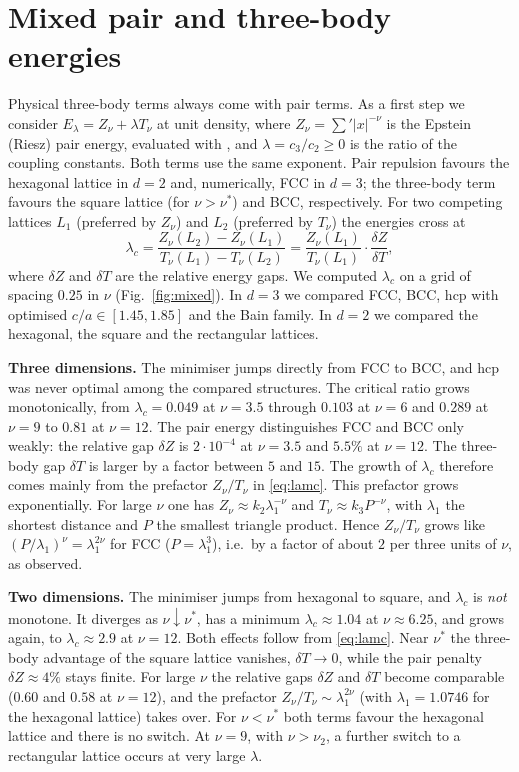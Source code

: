 \documentclass[10pt,twocolumn,a4paper]{article}
\theoremstyle{definition}
\begin{document}
\section{Mixed pair and three-body energies}\label{sec:mixed}
Physical three-body terms always come with pair terms. As a first step we consider
$E_\lambda=Z_\nu+\lambda T_\nu$ at unit density, where $Z_\nu=\sum'|x|^{-\nu}$ is the Epstein (Riesz) pair energy, evaluated with \cite{EpsteinLib}, and $\lambda=c_3/c_2\ge0$ is the ratio of the coupling constants. Both terms use the same exponent. Pair repulsion favours the hexagonal lattice in $d=2$ and, numerically, FCC in $d=3$; the three-body term favours the square lattice (for $\nu>\nu^*$) and BCC, respectively. For two competing lattices $L_1$ (preferred by $Z_\nu$) and $L_2$ (preferred by $T_\nu$) the energies cross at
\begin{equation}\label{eq:lamc}
\lambda_c=\frac{Z_\nu(L_2)-Z_\nu(L_1)}{T_\nu(L_1)-T_\nu(L_2)}=\frac{Z_\nu(L_1)}{T_\nu(L_1)}\cdot\frac{\delta Z}{\delta T},
\end{equation}
where $\delta Z$ and $\delta T$ are the relative energy gaps. We computed $\lambda_c$ on a grid of spacing $0.25$ in $\nu$ (Fig.~\ref{fig:mixed}). In $d=3$ we compared FCC, BCC, hcp with optimised $c/a\in[1.45,1.85]$ and the Bain family. In $d=2$ we compared the hexagonal, the square and the rectangular lattices.

\smallskip\noindent\textbf{Three dimensions.} The minimiser jumps directly from FCC to BCC, and hcp was never optimal among the compared structures. The critical ratio grows monotonically, from $\lambda_c=0.049$ at $\nu=3.5$ through $0.103$ at $\nu=6$ and $0.289$ at $\nu=9$ to $0.81$ at $\nu=12$. The pair energy distinguishes FCC and BCC only weakly: the relative gap $\delta Z$ is $2\cdot10^{-4}$ at $\nu=3.5$ and $5.5\%$ at $\nu=12$. The three-body gap $\delta T$ is larger by a factor between $5$ and $15$. The growth of $\lambda_c$ therefore comes mainly from the prefactor $Z_\nu/T_\nu$ in \eqref{eq:lamc}. This prefactor grows exponentially. For large $\nu$ one has $Z_\nu\approx k_2\lambda_1^{-\nu}$ and $T_\nu\approx k_3P^{-\nu}$, with $\lambda_1$ the shortest distance and $P$ the smallest triangle product. Hence $Z_\nu/T_\nu$ grows like $(P/\lambda_1)^\nu=\lambda_1^{2\nu}$ for FCC ($P=\lambda_1^3$), i.e.\ by a factor of about $2$ per three units of $\nu$, as observed.

\smallskip\noindent\textbf{Two dimensions.} The minimiser jumps from hexagonal to square, and $\lambda_c$ is \emph{not} monotone. It diverges as $\nu\downarrow\nu^*$, has a minimum $\lambda_c\approx1.04$ at $\nu\approx6.25$, and grows again, to $\lambda_c\approx2.9$ at $\nu=12$. Both effects follow from \eqref{eq:lamc}. Near $\nu^*$ the three-body advantage of the square lattice vanishes, $\delta T\to0$, while the pair penalty $\delta Z\approx4\%$ stays finite. For large $\nu$ the relative gaps $\delta Z$ and $\delta T$ become comparable ($0.60$ and $0.58$ at $\nu=12$), and the prefactor $Z_\nu/T_\nu\sim\lambda_1^{2\nu}$ (with $\lambda_1=1.0746$ for the hexagonal lattice) takes over. For $\nu<\nu^*$ both terms favour the hexagonal lattice and there is no switch. At $\nu=9$, with $\nu>\nu_2$, a further switch to a rectangular lattice occurs at very large $\lambda$.
\end{document}
